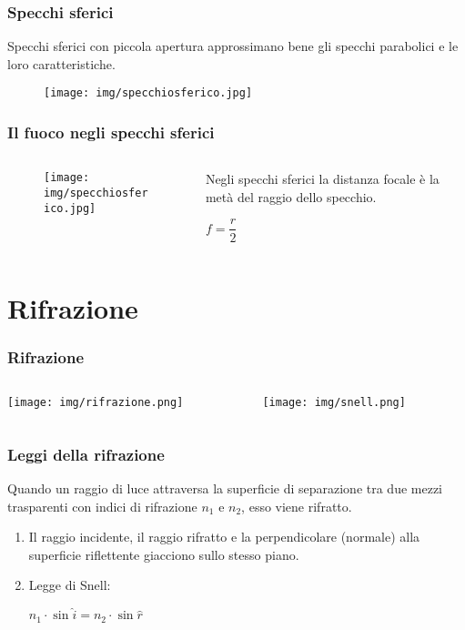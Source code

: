 \documentclass[]{beamer}
\theoremstyle{plain}
\begin{document}
\begin{frame}
\frametitle{Specchi sferici}
Specchi sferici con piccola apertura approssimano bene gli specchi parabolici e le loro caratteristiche.
\begin{figure}
\texttt{[image: img/specchiosferico.jpg]}
\end{figure}
\end{frame}


\begin{frame}
\frametitle{Il fuoco negli specchi sferici}
\begin{columns}
\begin{column}{0.45\textwidth}
\begin{figure}
\texttt{[image: img/specchiosferico.jpg]}
\end{figure}
\end{column}
\begin{column}{0.5\textwidth}
Negli specchi sferici \alert<1>{la distanza focale è la metà del raggio} dello specchio.
\begin{center}
\colorbox{blue!30}{$ f = \dfrac{r}{2} $}
\end{center}
\end{column}
\end{columns}
\end{frame}

\section{Rifrazione}


\begin{frame}
\frametitle{Rifrazione}
\begin{columns}
\begin{column}{0.3\textwidth}
\texttt{[image: img/rifrazione.png]}
\end{column}
\begin{column}{0.6\textwidth}
\texttt{[image: img/snell.png]}
\end{column}
\end{columns}
\end{frame}


\begin{frame}
\frametitle{Leggi della rifrazione}
Quando un raggio di luce attraversa la superficie di separazione tra due mezzi trasparenti con indici di rifrazione $ n_1 $ e $ n_2 $, esso viene rifratto.
\begin{enumerate}
  \item Il raggio incidente, il raggio rifratto e la perpendicolare (normale) alla superficie riflettente giacciono sullo stesso piano.
  \item Legge di Snell:
  \begin{center}
\colorbox{blue!30}{$ n_1 \cdot \sin \hat{i} = n_2 \cdot\sin \hat{r} $} 
\end{center}
\end{enumerate}
\end{frame}
\end{document}
